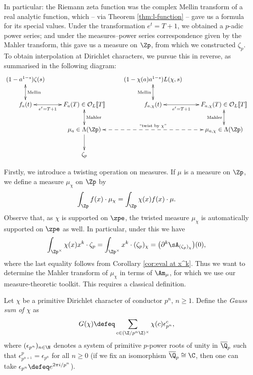 \documentclass[a4paper,10pt, english, reqno]{smfart}
\newcommand{\lsem}{[\! [}
\newcommand{\rsem}{]\! ]}
\numberwithin{equation}{section}
\begin{document}
In particular: the Riemann zeta function was the complex Mellin transform of a real analytic function, which -- via Theorem \ref{thm:l-function} -- gave us a formula for its special values. Under the transformation $e^t = T+1$, we obtained a $p$-adic power series; and under the measures--power series correspondence given by the Mahler transform, this gave us a measure on $\Zp$, from which we constructed $\zeta_p$. To obtain interpolation at Dirichlet characters, we pursue this in reverse, as summarised in the following diagram:
\[
\xymatrix{
	(1-a^{1-s})\zeta(s) \ar@{<->}[d]^-{\text{Mellin}} & 	&				(1-\chi(a)a^{1-s})L(\chi,s) & \\
	f_a(t) \ar@{<->}[r]_-{e^t = T+1} & F_a(T)\in \mathcal{O}_L\lsem T\rsem  \ar@{<->}[d]^-{\text{Mahler}} &		f_{a,\chi}(t) \ar@{<->}[r]_-{e^t = T+1}\ar@{<->}[u]^-{\text{Mellin}}& F_{a,\chi}(T) \in \mathcal{O}_L\lsem T\rsem \\
	& \mu_a \in \Lambda(\Zp)\ar[d]\ar@{<-->}[rr]^-{\text{``twist by $\chi$''}} &													&							\mu_{a,\chi} \in \Lambda(\Zp)\ar@{<->}[u]^-{\text{Mahler}}\\
		& \zeta_p	&&
}
\]



Firstly, we introduce a twisting operation on measures. If $\mu$ is a measure on $\Zp$, we define a measure $\mu_{\chi}$ on $\Zp$ by
\begin{equation}\label{eq:twist by chi}
\int_{\Zp}f(x) \cdot\mu_{\chi} = \int_{\Zp}\chi(x)f(x) \cdot\mu. 
\end{equation}
 Observe that, as $\chi$ is supported on $\zpe$, the twisted measure $\mu_{\chi}$ is automatically supported on $\zpe$ as well. In particular, under this we have
\begin{align*}
	\int_{\Zp^\times}\chi(x)x^k \cdot \zeta_p = \int_{\Zp^\times} x^k \cdot (\zeta_p)_{\chi} = \big(\partial^k \sA_{(\zeta_p)_\chi}\big)(0),
\end{align*}
where the last equality follows from Corollary \ref{cor:eval at x^k}. Thus we want to determine the Mahler transform of $\mu_{\chi}$ in terms of $\Am_\mu$, for which we use our measure-theoretic toolkit. This requires a classical definition.

\begin{definition} \label{DefGausssum}
Let $\chi$ be a primitive Dirichlet character of conductor $p^n$, $n \geq 1$. Define the \emph{Gauss sum of $\chi$} as 
\[ G(\chi) \defeq \sum_{c\in(\Z/p^n\Z)^\times} \chi(c) \epsilon_{p^n}^c, \]
where $(\epsilon_{p^n})_{n \in \N}$ denotes a system of primitive $p$-power roots of unity in $\overline{\Q}_p$ such that $\epsilon_{p^{n + 1}}^p = \epsilon_{p^n}$ for all $n \geq 0$ (if we fix an isomorphism $\overline{\Q}_p \cong \C$, then one can take $ \epsilon_{p^n} \defeq e^{2\pi i/p^n}$).
\end{definition}
\end{document}
